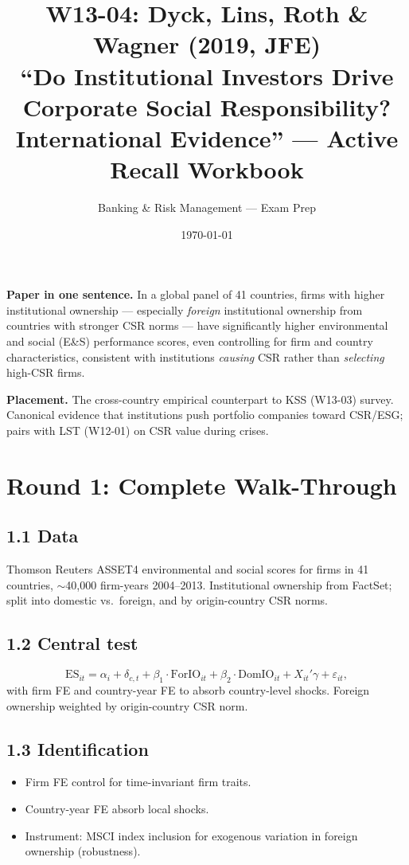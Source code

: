 \documentclass[11pt]{article}
\title{W13-04: Dyck, Lins, Roth \& Wagner (2019, JFE) \\
\large ``Do Institutional Investors Drive Corporate Social Responsibility? International Evidence'' --- Active Recall Workbook}
\author{Banking \& Risk Management --- Exam Prep}
\date{\today}
\begin{document}
\maketitle

\begin{keybox}
\textbf{Paper in one sentence.} In a global panel of 41 countries, firms with higher institutional ownership --- especially \emph{foreign} institutional ownership from countries with stronger CSR norms --- have significantly higher environmental and social (E\&S) performance scores, even controlling for firm and country characteristics, consistent with institutions \emph{causing} CSR rather than \emph{selecting} high-CSR firms.

\textbf{Placement.} The cross-country empirical counterpart to KSS (W13-03) survey. Canonical evidence that institutions push portfolio companies toward CSR/ESG; pairs with LST (W12-01) on CSR value during crises.
\end{keybox}

\section*{Round 1: Complete Walk-Through}

\subsection*{1.1 Data}
Thomson Reuters ASSET4 environmental and social scores for firms in 41 countries, $\sim$40{,}000 firm-years 2004--2013. Institutional ownership from FactSet; split into domestic vs.\ foreign, and by origin-country CSR norms.

\subsection*{1.2 Central test}
\[
\text{ES}_{it}=\alpha_i+\delta_{c,t}+\beta_1\cdot\text{ForIO}_{it}+\beta_2\cdot\text{DomIO}_{it}+X_{it}'\gamma+\varepsilon_{it},
\]
with firm FE and country-year FE to absorb country-level shocks. Foreign ownership weighted by origin-country CSR norm.

\subsection*{1.3 Identification}
\begin{itemize}
\item Firm FE control for time-invariant firm traits.
\item Country-year FE absorb local shocks.
\item Instrument: MSCI index inclusion for exogenous variation in foreign ownership (robustness).
\end{itemize}
\end{document}
